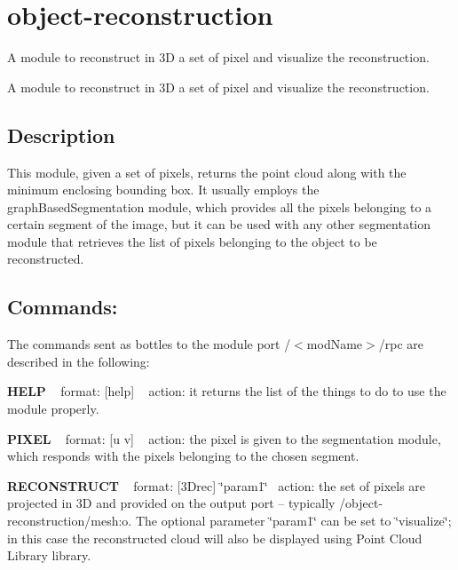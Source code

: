 \section{object-\/reconstruction}
\label{group__object-reconstruction}


A module to reconstruct in 3D a set of pixel and visualize the reconstruction.  


A module to reconstruct in 3D a set of pixel and visualize the reconstruction. 

\hypertarget{group__handIKModule_intro_sec}{}\subsection{Description}\label{group__handIKModule_intro_sec}
This module, given a set of pixels, returns the point cloud along with the minimum enclosing bounding box. It usually employs the graph\+Based\+Segmentation module, which provides all the pixels belonging to a certain segment of the image, but it can be used with any other segmentation module that retrieves the list of pixels belonging to the object to be reconstructed.\hypertarget{group__handIKModule_rpc_port}{}\subsection{Commands\+:}\label{group__handIKModule_rpc_port}
The commands sent as bottles to the module port /$<$mod\+Name$>$/rpc are described in the following\+:

{\bfseries H\+E\+LP} ~\newline
format\+: \mbox{[}help\mbox{]} ~\newline
action\+: it returns the list of the things to do to use the module properly.

{\bfseries P\+I\+X\+EL} ~\newline
format\+: \mbox{[}u v\mbox{]} ~\newline
action\+: the pixel is given to the segmentation module, which responds with the pixels belonging to the chosen segment.

{\bfseries R\+E\+C\+O\+N\+S\+T\+R\+U\+CT} ~\newline
format\+: \mbox{[}3\+Drec\mbox{]} \char`\"{}param1\char`\"{}~\newline
action\+: the set of pixels are projected in 3D and provided on the output port -- typically /object-\/reconstruction/mesh\+:o. The optional parameter \char`\"{}param1\char`\"{} can be set to \char`\"{}visualize\char`\"{}; in this case the reconstructed cloud will also be displayed using Point Cloud Library library.

